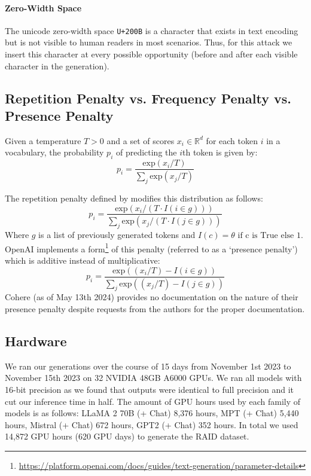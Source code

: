 \documentclass[11pt]{article}
\begin{document}
\paragraph{Zero-Width Space} The unicode zero-width space \texttt{U+200B} is a character that exists in text encoding but is not visible to human readers in most scenarios. Thus, for this attack we insert this character at every possible opportunity (before and after each visible character in the generation).

\subsection{Repetition Penalty vs. Frequency Penalty vs. Presence Penalty}
\label{app:repetition_penalty}
Given a temperature $T > 0$ and a set of scores $x_i \in \mathbb{R}^d$ for each token $i$ in a vocabulary, the probability $p_i$ of predicting the $i$th token is given by:
$$p_i = \frac{\text{exp}(x_i / T)}{\sum_j\text{exp}(x_j / T)}$$

The repetition penalty defined by \citet{keskar2019ctrl} modifies this distribution as follows:
$$p_i = \frac{\text{exp}(x_i / (T \cdot I(i\in g)))}{\sum_j\text{exp}(x_j / (T \cdot I(j\in g)))}$$
Where $g$ is a list of previously generated tokens and $I(c) = \theta \text{ if c is True else 1}$. OpenAI implements a form\footnote{\url{https://platform.openai.com/docs/guides/text-generation/parameter-details}} of this penalty (referred to as a `presence penalty') which is additive instead of multiplicative: 
$$p_i = \frac{\text{exp}((x_i / T) - I(i\in g))}{\sum_j\text{exp}((x_j / T) - I(j\in g))}$$
Cohere (as of May 13th 2024) provides no documentation on the nature of their presence penalty despite requests from the authors for the proper documentation.

\subsection{Hardware}
We ran our generations over the course of 15 days from November 1st 2023 to November 15th 2023 on 32 NVIDIA 48GB A6000 GPUs. We ran all models with 16-bit precision as we found that outputs were identical to full precision and it cut our inference time in half. The amount of GPU hours used by each family of models is as follows: LLaMA 2 70B (+ Chat) 8,376 hours, MPT (+ Chat) 5,440 hours, Mistral (+ Chat) 672 hours, GPT2 (+ Chat) 352 hours. In total we used 14,872 GPU hours (620 GPU days) to generate the RAID dataset.
\end{document}
